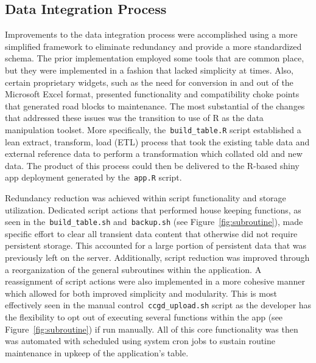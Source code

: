 \documentclass[10pt]{report}
\begin{document}
\subsection{Data Integration Process}
Improvements to the data integration process were accomplished using a more simplified framework to eliminate redundancy and provide a more standardized schema. The prior implementation employed some tools that are common place, but they were implemented in a fashion that lacked simplicity at times. Also, certain proprietary widgets, such as the need for conversion in and out of the Microsoft Excel format, presented functionality and compatibility choke points that generated road blocks to maintenance. The most substantial of the changes that addressed these issues was the transition to use of R as the data manipulation toolset. More specifically, the~\texttt{build\_table.R} script established a lean extract, transform, load (ETL) process that took the existing table data and external reference data to perform a transformation which collated old and new data. The product of this process could then be delivered to the R-based shiny app deployment generated by the~\texttt{app.R} script.

Redundancy reduction was achieved within script functionality and storage utilization. Dedicated script actions that performed house keeping functions, as seen in the~\texttt{build\_table.sh} and~\texttt{backup.sh} (see Figure~\ref{fig:subroutine}), made specific effort to clear all transient data content that otherwise did not require persistent storage. This accounted for a large portion of persistent data that was previously left on the server. Additionally, script reduction was improved through a reorganization of the general subroutines within the application. A reassignment of script actions were also implemented in a more cohesive manner which allowed for both improved simplicity and modularity. This is most effectively seen in the manual control~\texttt{ccgd\_upload.sh} script as the developer has the flexibility to opt out of executing several functions within the app (see Figure~\ref{fig:subroutine}) if run manually. All of this core functionality was then was automated with scheduled using system cron jobs to sustain routine maintenance in upkeep of the application's table.
\end{document}

